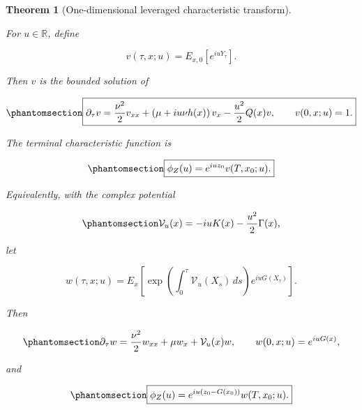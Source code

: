 \documentclass[
  english,
  11pt,
  letterpaper,
  DIV=11,
  numbers=noendperiod]{scrartcl}
\theoremstyle{plain}
\newtheorem{theorem}{Theorem}[section]
\theoremstyle{plain}
\theoremstyle{plain}
\theoremstyle{plain}
\theoremstyle{remark}
\begin{document}
\begin{theorem}[One-dimensional leveraged characteristic
transform]\protect\hypertarget{thm-leveraged-transform}{}\label{thm-leveraged-transform}

For \(u\in\mathbb R\), define

\[
v(\tau,x;u)
=E_{x,0}\left[e^{iuY_\tau}\right].
\]

Then \(v\) is the bounded solution of

\begin{equation}\protect\phantomsection\label{eq-complex-drift-pde}{
\boxed{
\partial_\tau v
=\frac{\nu^2}{2}v_{xx}
+\left(\mu+iu\nu h(x)\right)v_x
-\frac{u^2}{2}Q(x)v,
\qquad
v(0,x;u)=1.
}
}\end{equation}

The terminal characteristic function is

\begin{equation}\protect\phantomsection\label{eq-leveraged-cf}{
\boxed{
\phi_Z(u)=e^{iuz_0}v(T,x_0;u).
}
}\end{equation}

Equivalently, with the complex potential

\begin{equation}\protect\phantomsection\label{eq-complex-potential}{
\mathcal V_u(x)
=-iuK(x)-\frac{u^2}{2}\Gamma(x),
}\end{equation}

let

\[
w(\tau,x;u)
=E_x\left[
\exp\left(\int_0^\tau\mathcal V_u(X_s)\,ds\right)
e^{iuG(X_\tau)}
\right].
\]

Then

\begin{equation}\protect\phantomsection\label{eq-complex-potential-pde}{
\partial_\tau w
=\frac{\nu^2}{2}w_{xx}+\mu w_x+\mathcal V_u(x)w,
\qquad
w(0,x;u)=e^{iuG(x)},
}\end{equation}

and

\begin{equation}\protect\phantomsection\label{eq-gauged-cf}{
\boxed{
\phi_Z(u)
=e^{iu(z_0-G(x_0))}w(T,x_0;u).
}
}\end{equation}

\end{theorem}
\end{document}
